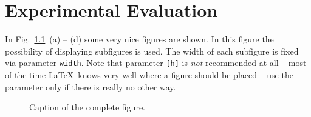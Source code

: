 \chapter{Experimental Evaluation}
\label{ch:experiments}

In Fig.~\ref{fig:figure_1}~(a) -- (d) some very nice figures are shown. In this figure the possibility of displaying subfigures is used. The width of each subfigure is fixed via parameter \texttt{width}. Note that parameter \texttt{[h]} is \textit{not} recommended at all -- most of the time \LaTeX~knows very well where a figure should be placed -- use the parameter only if there is really no other way. 

\begin{figure}[h] %
\centerline{
}
\centerline{
}

\caption{Caption of the complete figure.}
\label{fig:figure_1}
\end{figure} 	


